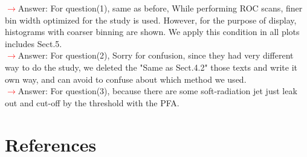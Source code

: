\documentclass[final,1p,11pt]{elsarticle}
\begin{document}
\begin{itemize}
 \textcolor{red}{$\rightarrow$}Answer: For question(1), same as before, While performing ROC scans, finer bin width optimized for the study is used. However, for the purpose of display, histograms with coarser binning are shown. We apply this condition in all plots includes Sect.5.\\
 \textcolor{red}{$\rightarrow$}Answer: For question(2), Sorry for confusion, since they had very different way to do the study, we deleted the "Same as Sect.4.2" those texts and write it own way, and can avoid to confuse about which method we used.\\
 \textcolor{red}{$\rightarrow$}Answer: For question(3), because there are some soft-radiation jet just leak out and cut-off by the threshold with the PFA. 
\end{itemize}

\section*{References}


\def\bibname{\Large\bf References}
\def\refname{\Large\bf References}
\pagestyle{plain}

\end{document}
